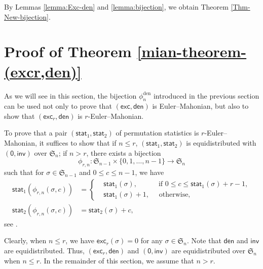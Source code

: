 \documentclass[12pt]{article}
\begin{document}
By Lemmas \ref{lemma:Exc-den} and \ref{lemma:bijection},
we obtain Theorem \ref{Thm-New-bijection}.


\section{Proof of Theorem \ref{mian-theorem-(excr,den)}}\label{Proof of Theorem 1.3}
As we will see in this section, 
the bijection $\phi_{n}^{\text{den}}$ introduced in the previous section can be used not only to prove that $(\textsf{exc},\textsf{den})$ is Euler--Mahonian, 
but also to show that  $(\textsf{exc}_{r},\textsf{den})$ is $r$-Euler--Mahonian.

To prove that a pair $(\textsf{stat}_{1},\textsf{stat}_{2})$ of permutation statistics is $r$-Euler--Mahonian, 
it suffices to show that if $n\leq r$,   $(\textsf{stat}_{1},\textsf{stat}_{2})$ is equidistributed with $(\textsf{0},\textsf{inv})$ over $\mathfrak{S}_{n}$;
if $n>r$, there exists a bijection 
\begin{equation*} \phi_{r,n}:\mathfrak{S}_{n-1}\times\{0,1,\ldots,n-1\}\rightarrow\mathfrak{S}_{n}
\end{equation*} 
such that for $\sigma\in\mathfrak{S}_{n-1}$ and $0\leq c\leq n-1$, 
we have
\begin{equation}\label{eq-r-Euler--Mahonian}
	\begin{split}
		\textsf{stat}_{1}(\phi_{r,n}(\sigma,c))&=\left
		\{
		\begin{aligned}
			&\textsf{stat}_{1}(\sigma), \quad\quad\quad\text{if~}0\leq c\leq \textsf{stat}_{1}(\sigma)+r-1,\\
			&\textsf{stat}_{1}(\sigma)+1,\quad\text{~otherwise,}
		\end{aligned}
		\right.\\ 
		\textsf{stat}_{2}(\phi_{r,n}(\sigma,c))&=\textsf{stat}_{2}(\sigma)+c,
	\end{split}
\end{equation} 
see \cite{Rawlings-1981}.

Clearly,  when $n\leq r$, 
we have $\textsf{exc}_{r}(\sigma)=0$ for any $\sigma\in\mathfrak{S}_{n}$. 
Note that $\textsf{den}$ and $\textsf{inv}$ are equidistributed.
Thus, 
$(\textsf{exc}_{r},\textsf{den})$ and $(\textsf{0},\textsf{inv})$ are equidistributed over $\mathfrak{S}_{n}$ when $n\leq r$.
In the remainder of this section,  we assume that $n>r$.
\end{document}
